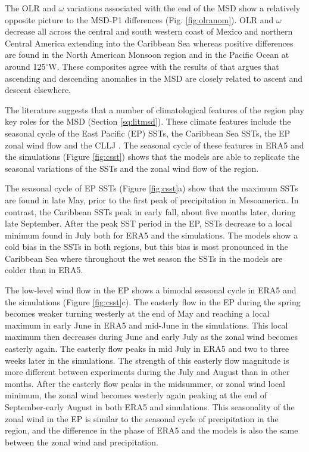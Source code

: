  
 The OLR and $\omega$ variations associated with the end of the MSD show a relatively opposite picture to the MSD-P1 differences (Fig. \ref{fig:olranom}). OLR and $\omega$ decrease all across the central and south western coast of Mexico and northern Central America extending into the Caribbean Sea whereas positive differences are found in the North American Monsoon region and in the Pacific Ocean at around 125$^\circ$W.  These composites agree with the results of \cite{herrera2015} that argues that ascending and descending anomalies in the MSD are closely related to ascent and descent elsewhere.

The literature suggests that a number of climatological features of the region play key roles for the MSD (Section \ref{sq:litmsd}). These climate features include the seasonal cycle of the East Pacific (EP) SSTs, the Caribbean Sea SSTs, the EP zonal wind flow and the CLLJ \citep{magana1999,amador2008,herrera2015,straffon2019,garcia2020sub}. 
The seasonal cycle of these features in ERA5 and the simulations (Figure \ref{fig:csst}) shows that the models are able to replicate the seasonal variations of the SSTs and the zonal wind flow of the region. %

The seasonal cycle of EP SSTs (Figure \ref{fig:csst}a) show that the maximum SSTs are found in late May, prior to the first peak of precipitation in Mesoamerica. In contrast, the Caribbean SSTs peak in early fall, about five months later, during late September. After the peak SST period in the EP, SSTs decrease to a local minimum found in July both for ERA5 and the simulations. The models show a cold bias in the SSTs in both regions, but this bias is most pronounced in the Caribbean Sea where throughout the wet season the SSTs in the models are colder than in ERA5. 

 The low-level wind flow in the EP shows a bimodal seasonal cycle in ERA5 and the simulations (Figure \ref{fig:csst}c).
The easterly flow in the EP during the spring becomes weaker turning westerly at the end of May and reaching a local maximum in early June in ERA5 and mid-June in the simulations. This local maximum then decreases during June and early July as the zonal wind becomes easterly again. The easterly flow peaks in mid July in ERA5 and two to three weeks later in the simulations. The strength of this easterly flow magnitude  is more different between experiments during the July and August than in other months. 
After the easterly flow peaks in  the midsummer, or zonal wind local minimum, the zonal wind becomes westerly again peaking at the end of September-early August in both ERA5 and simulations. 
This seasonality of the zonal wind in the EP is similar to the seasonal cycle of precipitation in the region, and the difference in the phase of ERA5 and the models is also the same between the zonal wind and precipitation.

